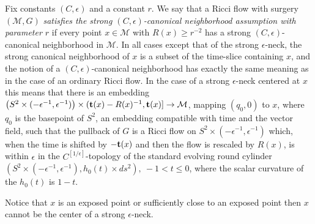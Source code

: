 \begin{definition}
\label{def:strong-canonical-neighborhood-assumption}
Fix constants $(C,\epsilon)$ and a constant $r$. We say that a Ricci
flow with surgery $({\mathcal M},G)$ {\em satisfies the strong
$(C,\epsilon)$-canonical neighborhood assumption with parameter $r$}
if every point $x\in {\mathcal M}$ with $R(x)\ge r^{-2}$ has a strong
$(C,\epsilon)$-canonical neighborhood in ${\mathcal M}$. In all
cases except that of the strong $\epsilon$-neck, the strong
canonical neighborhood of $x$ is a subset of the time-slice
containing $x$, and the notion of a $(C,\epsilon)$-canonical
neighborhood has exactly the same meaning as in the case of an
ordinary Ricci flow. In the case of a strong $\epsilon$-neck
centered at $x$ this means that there is an embedding
$\left(S^2\times (-\epsilon^{-1},\epsilon^{-1})\right)\times ({\bf
t}(x)-R(x)^{-1},{\bf t}(x)]\to {\mathcal M}$, mapping $(q_0,0)$ to $x$,
 where $q_0$ is the basepoint of $S^2$, an embedding
compatible with time and the vector field,
such that the pullback
of $G$ is a Ricci flow on $S^2\times (-\epsilon^{-1},\epsilon^{-1})$
which, when the time is shifted by $-{\bf t}(x)$ and then the flow
is rescaled by $R(x)$, is within $\epsilon$ in the
$C^{[1/\epsilon]}$-topology of the standard evolving round cylinder
$\left(S^2\times(-\epsilon^{-1},\epsilon^{-1}),h_0(t)\times
ds^2\right),\ -1<t\le 0$, where the scalar curvature of the $h_0(t)$
is $1-t$.
\end{definition}

Notice that $x$ is an exposed point or sufficiently close to an exposed point
then $x$ cannot be the center of a strong $\epsilon$-neck.

